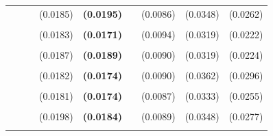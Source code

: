 \documentclass[
  12pt,
]{article}
\begin{document}
\begin{table}[H]
{\begin{tabular}[t]{llll>{}lllll}
 &  &  & (0.0185) & \textbf{(0.0195)} &  & (0.0086) & (0.0348) & (0.0262)\\
\addlinespace
\cellcolor{gray!6}{c.bn6.r20} & \cellcolor{gray!6}{-90.1022} & \cellcolor{gray!6}{-96.1703} & \cellcolor{gray!6}{0.7338} & \textbf{\cellcolor{gray!6}{0.6751}} & \cellcolor{gray!6}{0.6581} & \cellcolor{gray!6}{0.4126} & \cellcolor{gray!6}{0.2273} & \cellcolor{gray!6}{0.2219}\\
 &  &  & (0.0183) & \textbf{(0.0171)} &  & (0.0094) & (0.0319) & (0.0222)\\
\addlinespace
\cellcolor{gray!6}{c.hamilton28.panel} & \cellcolor{gray!6}{-129.1730} & \cellcolor{gray!6}{-135.2411} & \cellcolor{gray!6}{0.7382} & \textbf{\cellcolor{gray!6}{0.6740}} & \cellcolor{gray!6}{9.7674} & \cellcolor{gray!6}{0.3977} & \cellcolor{gray!6}{0.2386} & \cellcolor{gray!6}{0.2151}\\
 &  &  & (0.0187) & \textbf{(0.0189)} &  & (0.0090) & (0.0319) & (0.0224)\\
\addlinespace
\cellcolor{gray!6}{c.hamilton13.panel} & \cellcolor{gray!6}{-122.0054} & \cellcolor{gray!6}{-128.0735} & \cellcolor{gray!6}{0.7208} & \textbf{\cellcolor{gray!6}{0.6684}} & \cellcolor{gray!6}{7.2247} & \cellcolor{gray!6}{0.3509} & \cellcolor{gray!6}{0.3239} & \cellcolor{gray!6}{0.2280}\\
 &  &  & (0.0182) & \textbf{(0.0174)} &  & (0.0090) & (0.0362) & (0.0296)\\
\addlinespace
\cellcolor{gray!6}{c.ma} & \cellcolor{gray!6}{-97.4868} & \cellcolor{gray!6}{-103.5549} & \cellcolor{gray!6}{0.7133} & \textbf{\cellcolor{gray!6}{0.6677}} & \cellcolor{gray!6}{6.0375} & \cellcolor{gray!6}{0.4073} & \cellcolor{gray!6}{0.2727} & \cellcolor{gray!6}{0.2403}\\
 &  &  & (0.0181) & \textbf{(0.0174)} &  & (0.0087) & (0.0333) & (0.0255)\\
\addlinespace
\cellcolor{gray!6}{c.bn6} & \cellcolor{gray!6}{-104.1404} & \cellcolor{gray!6}{-110.2085} & \cellcolor{gray!6}{0.7042} & \textbf{\cellcolor{gray!6}{0.6426}} & \cellcolor{gray!6}{0.8256} & \cellcolor{gray!6}{0.4040} & \cellcolor{gray!6}{0.2955} & \cellcolor{gray!6}{0.2505}\\
 &  &  & (0.0198) & \textbf{(0.0184)} &  & (0.0089) & (0.0348) & (0.0277)\\
\addlinespace
\cellcolor{gray!6}{c.hp125k} & \cellcolor{gray!6}{-92.8331} & \cellcolor{gray!6}{-98.9012} & \cellcolor{gray!6}{0.6977} & \textbf{\cellcolor{gray!6}{0.6397}} & \cellcolor{gray!6}{3.6972} & \cellcolor{gray!6}{0.3788} & \cellcolor{gray!6}{0.3239} & \cellcolor{gray!6}{0.2484}\\

\end{tabular}}
\end{table}
\end{document}
